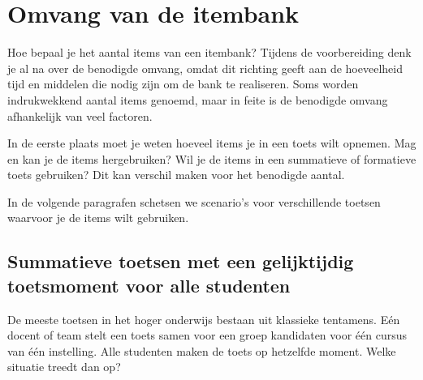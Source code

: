 \documentclass[
]{book}
\begin{document}
\hypertarget{omvang-van-de-itembank}{%
\section{Omvang van de itembank}\label{omvang-van-de-itembank}}

Hoe bepaal je het aantal items van een itembank? Tijdens de voorbereiding denk je al na over de benodigde omvang, omdat dit richting geeft aan de hoeveelheid tijd en middelen die nodig zijn om de bank te realiseren. Soms worden indrukwekkend aantal items genoemd, maar in feite is de benodigde omvang afhankelijk van veel factoren.

In de eerste plaats moet je weten hoeveel items je in een toets wilt opnemen. Mag en kan je de items hergebruiken? Wil je de items in een summatieve of formatieve toets gebruiken? Dit kan verschil maken voor het benodigde aantal.

In de volgende paragrafen schetsen we scenario's voor verschillende toetsen waarvoor je de items wilt gebruiken.

\hypertarget{summatieve-toetsen-met-een-gelijktijdig-toetsmoment-voor-alle-studenten}{%
\subsection{Summatieve toetsen met een gelijktijdig toetsmoment voor alle studenten}\label{summatieve-toetsen-met-een-gelijktijdig-toetsmoment-voor-alle-studenten}}

De meeste toetsen in het hoger onderwijs bestaan uit klassieke tentamens. Eén docent of team stelt een toets samen voor een groep kandidaten voor één cursus van één instelling. Alle studenten maken de toets op hetzelfde moment. Welke situatie treedt dan op?
\end{document}
